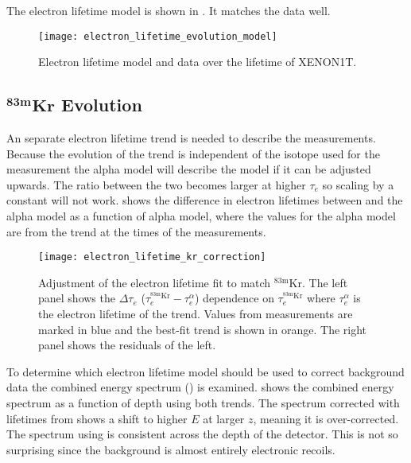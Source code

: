 The electron lifetime model is shown in .  It matches the data well.

\begin{figure}
\centering
\texttt{[image: electron\_lifetime\_evolution\_model]}
\caption{Electron lifetime model and data over the lifetime of XENON1T.}
\label{fig:elifetime_fit_results_elifetime}
\end{figure}


\subsection[$\mathrm{^{83m}Kr}$ Evolution][$\mathrm{^{83m}Kr}$ Evolution]{$\mathbf{^{83m}Kr}$ Evolution}
\label{subsec:elifetime_fit_kr}
An separate electron lifetime trend is needed to describe the \metakr measurements.  Because the evolution of the trend is independent
of the isotope used for the measurement the alpha model will describe the \metakr model if it can be adjusted upwards.  The ratio
between the two becomes larger at higher $\tau_e$ so scaling by a constant will not work.   shows
the difference in electron lifetimes between \metakr and the alpha model as a function of alpha model, where the values for the alpha
model are from the trend at the times of the \metakr measurements.

\begin{figure}
\centering
\texttt{[image: electron\_lifetime\_kr\_correction]}
\caption{Adjustment of the electron lifetime fit to match $\mathrm{^{83m}Kr}$.  The left panel shows the $\Delta \tau_e$
($\tau_e^{\mathrm{^{83m}Kr}} - \tau_e^{\alpha}$) dependence on $\tau_e^{\mathrm{^{83m}Kr}}$ where $\tau_e^{\alpha}$ is the electron
lifetime of the trend.  Values from \metakr measurements are marked in blue and the best-fit trend is shown in orange.  The right panel
shows the residuals of the left.}
\label{fig:elifetime_fit_kr_correction}
\end{figure}

To determine which electron lifetime model should be used to correct background data the combined energy spectrum
() is examined.   shows the combined energy spectrum as a function
of depth using both trends.  The spectrum corrected with lifetimes from \alphadecays shows a shift to higher $E$ at larger $z$, meaning
it is over-corrected.  The spectrum using \metakr is consistent across the depth of the detector.  This is not so surprising since the
background is almost entirely electronic recoils.


